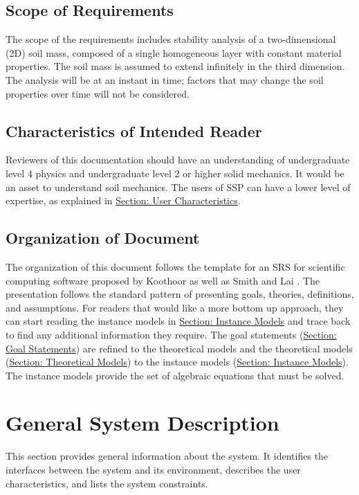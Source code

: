 \documentclass[12pt]{article}
\begin{document}
\subsection{Scope of Requirements}
\label{Sec:ReqsScope}
The scope of the requirements includes stability analysis of a two-dimensional (2D) soil mass, composed of a single homogeneous layer with constant material properties. The soil mass is assumed to extend infinitely in the third dimension. The analysis will be at an instant in time; factors that may change the soil properties over time will not be considered.
\subsection{Characteristics of Intended Reader}
\label{Sec:ReaderChars}
Reviewers of this documentation should have an understanding of undergraduate level 4 physics and undergraduate level 2 or higher solid mechanics. It would be an asset to understand soil mechanics. The users of SSP can have a lower level of expertise, as explained in \hyperref[Sec:UserChars]{Section: User Characteristics}.
\subsection{Organization of Document}
\label{Sec:DocOrg}
The organization of this document follows the template for an SRS for scientific computing software proposed by Koothoor \cite{koothoor2013} as well as Smith and Lai \cite{smithLai2005}. The presentation follows the standard pattern of presenting goals, theories, definitions, and assumptions. For readers that would like a more bottom up approach, they can start reading the instance models in \hyperref[Sec:IMs]{Section: Instance Models} and trace back to find any additional information they require.
The goal statements (\hyperref[Sec:GoalStmt]{Section: Goal Statements}) are refined to the theoretical models and the theoretical models (\hyperref[Sec:TMs]{Section: Theoretical Models}) to the instance models (\hyperref[Sec:IMs]{Section: Instance Models}). The instance models provide the set of algebraic equations that must be solved.
\section{General System Description}
\label{Sec:GenSysDesc}
This section provides general information about the system. It identifies the interfaces between the system and its environment, describes the user characteristics, and lists the system constraints.
\end{document}
